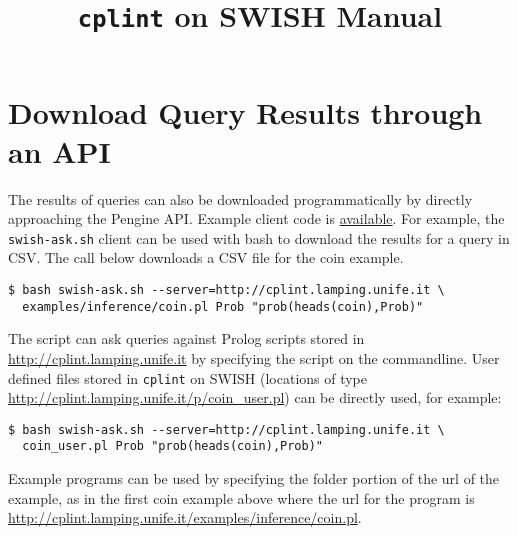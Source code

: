 \documentclass[a4paper,10pt]{scrartcl}
\begin{document}
\title{\texttt{cplint} on SWISH Manual}
\maketitle

%















\section{Download Query Results through an API}
The results of queries can also be downloaded programmatically by directly
approaching the Pengine API. Example client code is 
\href{https://github.com/friguzzi/swish/tree/master/client}{available}.  For example, the \verb|swish-ask.sh| client
can be used with bash to download the results for a query in CSV.  The call
below downloads a CSV file for the coin example.
\begin{verbatim}
$ bash swish-ask.sh --server=http://cplint.lamping.unife.it \   
  examples/inference/coin.pl Prob "prob(heads(coin),Prob)"
\end{verbatim}
The script can ask queries against Prolog scripts stored in 
\url{http://cplint.lamping.unife.it} by specifying
the script on the commandline.  User defined files stored
in \texttt{cplint} on SWISH (locations of type
\url{http://cplint.lamping.unife.it/p/coin_user.pl}) can
be directly used, for example:
\begin{verbatim}
$ bash swish-ask.sh --server=http://cplint.lamping.unife.it \
  coin_user.pl Prob "prob(heads(coin),Prob)"
\end{verbatim}
Example programs can be used by specifying the folder portion of the url of the example,
as in the first coin example above where the url for the program is 
\url{http://cplint.lamping.unife.it/examples/inference/coin.pl}.
\end{document}
